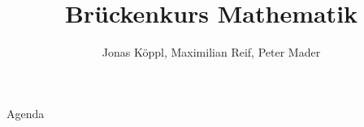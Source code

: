 \documentclass[notheorems]{beamer}
\title{Brückenkurs Mathematik}
\author[]{Jonas Köppl, Maximilian Reif, Peter Mader}
\institute[]{Universität Passau}
\date{}
\numberwithin{theorem}{section}
\numberwithin{theorem}{section}
\numberwithin{theorem}{section}
\numberwithin{theorem}{section}
\numberwithin{theorem}{section}
\numberwithin{theorem}{section}
\begin{document}
\begin{frame}
    \titlepage
\end{frame}

\begin{frame}{Agenda}
    \tableofcontents
\end{frame}






\end{document}
